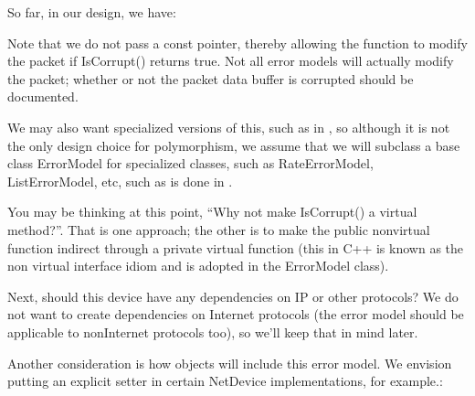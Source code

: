 \documentclass[letterpaper,10pt,english]{sphinxmanual}
\begin{document}
So far, in our design, we have:

\begin{sphinxVerbatim}[commandchars=\\\{\}]
 
     
\end{sphinxVerbatim}

Note that we do not pass a const pointer, thereby allowing the function to
modify the packet if IsCorrupt() returns true. Not all error models will
actually modify the packet; whether or not the packet data buffer is corrupted
should be documented.

We may also want specialized versions of this, such as in , so although it
is not the only design choice for polymorphism, we assume that we will subclass
a base class ErrorModel for specialized classes, such as RateErrorModel,
ListErrorModel, etc, such as is done in .

You may be thinking at this point, “Why not make IsCorrupt() a virtual method?”.
That is one approach; the other is to make the public non\sphinxhyphen{}virtual function
indirect through a private virtual function (this in C++ is known as the non
virtual interface idiom and is adopted in the  ErrorModel class).

Next, should this device have any dependencies on IP or other protocols?  We do
not want to create dependencies on Internet protocols (the error model should be
applicable to non\sphinxhyphen{}Internet protocols too), so we’ll keep that in mind later.

Another consideration is how objects will include this error model.  We envision
putting an explicit setter in certain NetDevice implementations, for example.:

\begin{sphinxVerbatim}[commandchars=\\\{\}]
  
\end{sphinxVerbatim}
\end{document}

